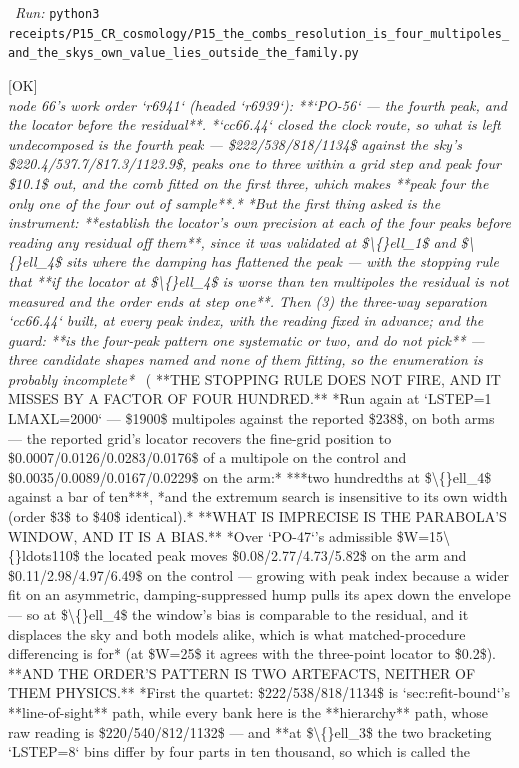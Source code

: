 \begin{description}
\ \emph{Run:} \texttt{python3 receipts/P15\_CR\_cosmology/P15\_the\_combs\_resolution\_is\_four\_multipoles\_and\_the\_skys\_own\_value\_lies\_outside\_the\_family.py}
\item[\rcptlabel{P15_the_locator_is_good_to_three_hundredths_and_the_fourth_peaks_residual_is_the_controls_too}{P15R192}\textbf{P15R192}\quad\texttt{P15\_the\_locator\_is\_good\_to\_three\_hundredths\_and\_the\_fourth\_peaks\_residual\_is\_the\_controls\_too}]\hfill\textsf{[OK]}\\
\textit{node 66's work order `r6941` (headed `r6939`): **`PO-56` --- the fourth peak, and the locator before the residual**. *`cc66.44` closed the clock route, so what is left undecomposed is the fourth peak --- \$222/538/818/1134\$ against the sky's \$220.4/537.7/817.3/1123.9\$, peaks one to three within a grid step and peak four \$10.1\$ out, and the comb fitted on the first three, which makes **peak four the only one of the four out of sample**.*  *But the first thing asked is the instrument: **establish the locator's own precision at each of the four peaks before reading any residual off them**, since it was validated at \$\textbackslash\{\}ell\_1\$ and \$\textbackslash\{\}ell\_4\$ sits where the damping has flattened the peak --- with the stopping rule that **if the locator at \$\textbackslash\{\}ell\_4\$ is worse than ten multipoles the residual is not measured and the order ends at step one**. Then (3) the three-way separation `cc66.44` built, at every peak index, with the reading fixed in advance; and the guard: **is the four-peak pattern one systematic or two, and do not pick** --- three candidate shapes named and none of them fitting, so the enumeration is probably incomplete*} \ ( **THE STOPPING RULE DOES NOT FIRE, AND IT MISSES BY A FACTOR OF FOUR HUNDRED.** *Run again at `LSTEP=1 LMAXL=2000` --- \$1900\$ multipoles against the reported \$238\$, on both arms --- the reported grid's locator recovers the fine-grid position to \$0.0007/0.0126/0.0283/0.0176\$ of a multipole on the control and \$0.0035/0.0089/0.0167/0.0229\$ on the arm:* ***two hundredths at \$\textbackslash\{\}ell\_4\$ against a bar of ten***, *and the extremum search is insensitive to its own width (order \$3\$ to \$40\$ identical).*  **WHAT IS IMPRECISE IS THE PARABOLA'S WINDOW, AND IT IS A BIAS.** *Over `PO-47`'s admissible \$W=15\textbackslash\{\}ldots110\$ the located peak moves \$0.08/2.77/4.73/5.82\$ on the arm and \$0.11/2.98/4.97/6.49\$ on the control --- growing with peak index because a wider fit on an asymmetric, damping-suppressed hump pulls its apex down the envelope --- so at \$\textbackslash\{\}ell\_4\$ the window's bias is comparable to the residual, and it displaces the sky and both models alike, which is what matched-procedure differencing is for* (at \$W=25\$ it agrees with the three-point locator to \$0.2\$).  **AND THE ORDER'S PATTERN IS TWO ARTEFACTS, NEITHER OF THEM PHYSICS.** *First the quartet: \$222/538/818/1134\$ is `sec:refit-bound`'s **line-of-sight** path, while every bank here is the **hierarchy** path, whose raw reading is \$220/540/812/1132\$ --- and **at \$\textbackslash\{\}ell\_3\$ the two bracketing `LSTEP=8` bins differ by four parts in ten thousand, so which is called the 
\end{description}
